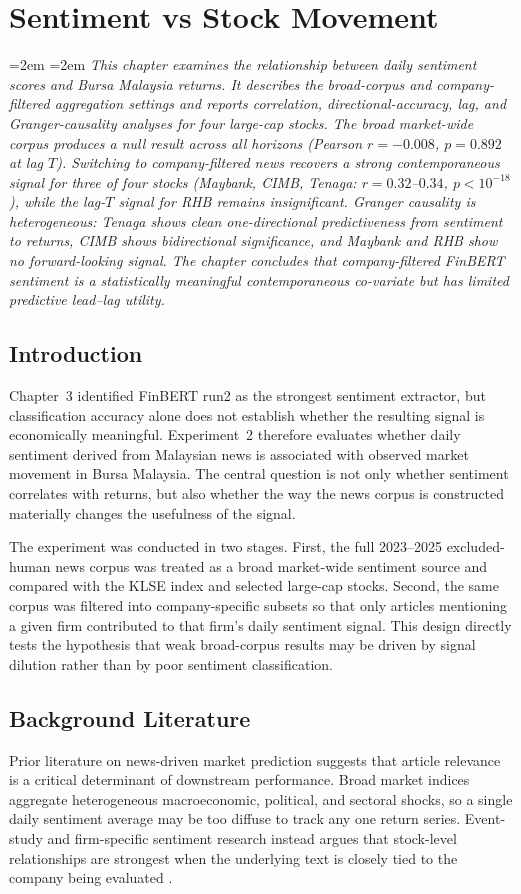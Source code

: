 \documentclass[12pt]{ucetd}
\newcommand{\chapterabstract}[1]{%
  \par\vspace{1em}
  \begingroup
  \leftskip=2em
  \rightskip=2em
  \noindent\itshape
  #1
  \par
  \endgroup
  \vspace{1.5em}
}
\begin{document}
\chapter{Sentiment vs Stock Movement}

\chapterabstract{This chapter examines the relationship between daily sentiment scores and Bursa Malaysia returns. It describes the broad-corpus and company-filtered aggregation settings and reports correlation, directional-accuracy, lag, and Granger-causality analyses for four large-cap stocks. The broad market-wide corpus produces a null result across all horizons (Pearson $r = -0.008$, $p = 0.892$ at lag $T$). Switching to company-filtered news recovers a strong contemporaneous signal for three of four stocks (Maybank, CIMB, Tenaga: $r = 0.32$--$0.34$, $p < 10^{-18}$), while the lag-$T$ signal for RHB remains insignificant. Granger causality is heterogeneous: Tenaga shows clean one-directional predictiveness from sentiment to returns, CIMB shows bidirectional significance, and Maybank and RHB show no forward-looking signal. The chapter concludes that company-filtered FinBERT sentiment is a statistically meaningful contemporaneous co-variate but has limited predictive lead--lag utility.}

\section{Introduction}
Chapter~3 identified FinBERT run2 as the strongest sentiment extractor, but classification accuracy alone does not establish whether the resulting signal is economically meaningful. Experiment~2 therefore evaluates whether daily sentiment derived from Malaysian news is associated with observed market movement in Bursa Malaysia. The central question is not only whether sentiment correlates with returns, but also whether the way the news corpus is constructed materially changes the usefulness of the signal.

The experiment was conducted in two stages. First, the full 2023--2025 excluded-human news corpus was treated as a broad market-wide sentiment source and compared with the KLSE index and selected large-cap stocks. Second, the same corpus was filtered into company-specific subsets so that only articles mentioning a given firm contributed to that firm's daily sentiment signal. This design directly tests the hypothesis that weak broad-corpus results may be driven by signal dilution rather than by poor sentiment classification.
\section{Background Literature}
Prior literature on news-driven market prediction suggests that article relevance is a critical determinant of downstream performance. Broad market indices aggregate heterogeneous macroeconomic, political, and sectoral shocks, so a single daily sentiment average may be too diffuse to track any one return series. Event-study and firm-specific sentiment research instead argues that stock-level relationships are strongest when the underlying text is closely tied to the company being evaluated \cite{tetlock2007giving, tetlock2008words, bollen2011twitter, cristescu2023analyzing, davidovic2025news}.
\end{document}
